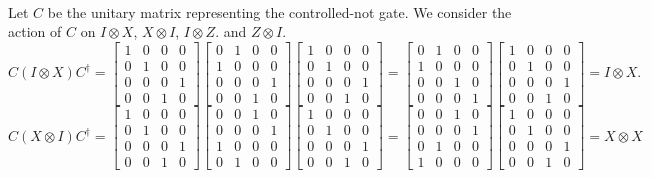 \documentclass[letterpaper,12pt,oneside,onecolumn]{article}
\begin{document}
\paragraph{}
Let $C$ be the unitary matrix representing the controlled-not gate. We consider the action of $C$ on $I \otimes X$, $X\otimes I$, $I \otimes Z$. and $Z \otimes I$.
$$C (I\otimes X) C^\dagger = \begin{bmatrix} 1 & 0 & 0 & 0 \\ 0 & 1 & 0 & 0 \\ 0 & 0 & 0 &1 \\ 0& 0& 1 & 0 \end{bmatrix}\begin{bmatrix}0 & 1 & 0 & 0 \\ 1 & 0 & 0 &0 \\ 0 & 0 &0 & 1 \\ 0 & 0 & 1 & 0 \end{bmatrix} \begin{bmatrix} 1 & 0 & 0 & 0 \\ 0 & 1 & 0 & 0 \\ 0 & 0 & 0 &1 \\ 0& 0& 1 & 0 \end{bmatrix} = \begin{bmatrix} 0 & 1& 0& 0\\ 1 & 0  & 0& 0\\ 0 & 0 & 1 & 0\\ 0 & 0 & 0 & 1\end{bmatrix} \begin{bmatrix} 1 & 0 & 0 & 0 \\ 0 & 1 & 0 & 0 \\ 0 & 0 & 0 &1 \\ 0& 0& 1 & 0 \end{bmatrix} = I \otimes X.$$
$$ C (X \otimes I) C^\dagger =  \begin{bmatrix} 1 & 0 & 0 & 0 \\ 0 & 1 & 0 & 0 \\ 0 & 0 & 0 &1 \\ 0& 0& 1 & 0 \end{bmatrix} \begin{bmatrix}  0 & 0 & 1 & 0 \\ 0 & 0 & 0 & 1 \\ 1 & 0 & 0 & 0 \\ 0 &1 & 0 &0\end{bmatrix} \begin{bmatrix} 1 & 0 & 0 & 0 \\ 0 & 1 & 0 & 0 \\ 0 & 0 & 0 &1 \\ 0& 0& 1 & 0 \end{bmatrix}  =  \begin{bmatrix} 0 & 0 &1 & 0 \\ 0 & 0 & 0 & 1 \\ 0 & 1 & 0 & 0 \\ 1 & 0 & 0 &0\end{bmatrix} \begin{bmatrix} 1 & 0 & 0 & 0 \\ 0 & 1 & 0 & 0 \\ 0 & 0 & 0 &1 \\ 0& 0& 1 & 0 \end{bmatrix} = X \otimes X$$
\end{document}
